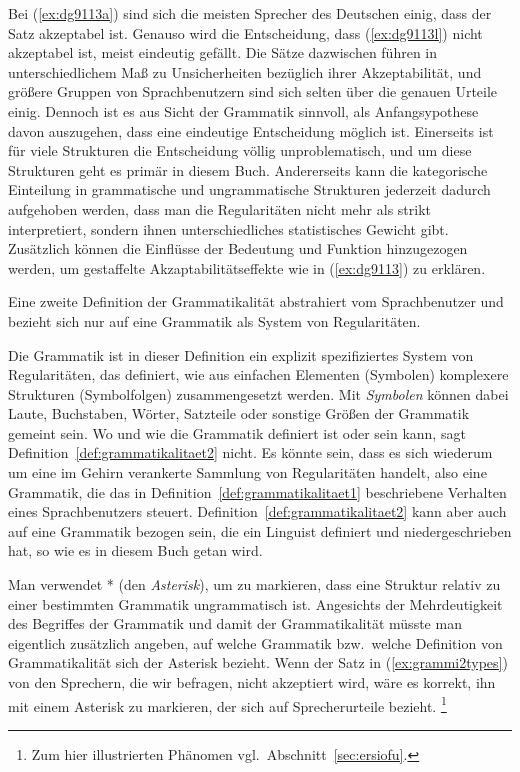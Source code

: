 Bei (\ref{ex:dg9113a}) sind sich die meisten Sprecher des Deutschen einig, dass der Satz akzeptabel ist.
Genauso wird die Entscheidung, dass (\ref{ex:dg9113l}) nicht akzeptabel ist, meist eindeutig gefällt.
Die Sätze dazwischen führen in unterschiedlichem Maß zu Unsicherheiten bezüglich ihrer Akzeptabilität, und größere Gruppen von Sprachbenutzern sind sich selten über die genauen Urteile einig.
Dennoch ist es aus Sicht der Grammatik sinnvoll, als Anfangsypothese davon auszugehen, dass eine eindeutige Entscheidung möglich ist.
Einerseits ist für viele Strukturen die Entscheidung völlig unproblematisch, und um diese Strukturen geht es primär in diesem Buch.
Andererseits kann die kategorische Einteilung in grammatische und ungrammatische Strukturen jederzeit dadurch aufgehoben werden, dass man die Regularitäten nicht mehr als strikt interpretiert, sondern ihnen \zB unterschiedliches statistisches Gewicht gibt.
Zusätzlich können die Einflüsse der Bedeutung und Funktion hinzugezogen werden, um gestaffelte Akzaptabilitätseffekte wie in (\ref{ex:dg9113}) zu erklären.

Eine zweite Definition der Grammatikalität abstrahiert vom Sprachbenutzer und bezieht sich nur auf eine Grammatik als System von Regularitäten.


Die Grammatik ist in dieser Definition ein explizit spezifiziertes System von Regularitäten, das definiert, wie aus einfachen Elementen (Symbolen) komplexere Strukturen (Symbolfolgen) zusammengesetzt werden.
Mit \textit{Symbolen} können dabei Laute, Buchstaben, Wörter, Satzteile oder sonstige Größen der Grammatik gemeint sein.
Wo und wie die Grammatik definiert ist oder sein kann, sagt Definition~\ref{def:grammatikalitaet2} nicht.
Es könnte sein, dass es sich wiederum um eine im Gehirn verankerte Sammlung von Regularitäten handelt, also eine Grammatik, die das in Definition~\ref{def:grammatikalitaet1} beschriebene Verhalten eines Sprachbenutzers steuert.
Definition~\ref{def:grammatikalitaet2} kann aber auch auf eine Grammatik bezogen sein, die ein Linguist definiert und niedergeschrieben hat, so wie es in diesem Buch getan wird.

Man verwendet * (den \textit{Asterisk}), um zu markieren, dass eine Struktur relativ zu einer bestimmten Grammatik ungrammatisch ist.
Angesichts der Mehrdeutigkeit des Begriffes der Grammatik und damit der Grammatikalität müsste man eigentlich zusätzlich angeben, auf welche Grammatik bzw.\ welche Definition von Grammatikalität sich der Asterisk bezieht.
Wenn der Satz in (\ref{ex:grammi2types}) von den Sprechern, die wir befragen, nicht akzeptiert wird, wäre es korrekt, ihn mit einem Asterisk zu markieren, der sich auf Sprecherurteile bezieht.%
\footnote{Zum hier illustrierten Phänomen vgl.\ Abschnitt~\ref{sec:ersiofu}.}

